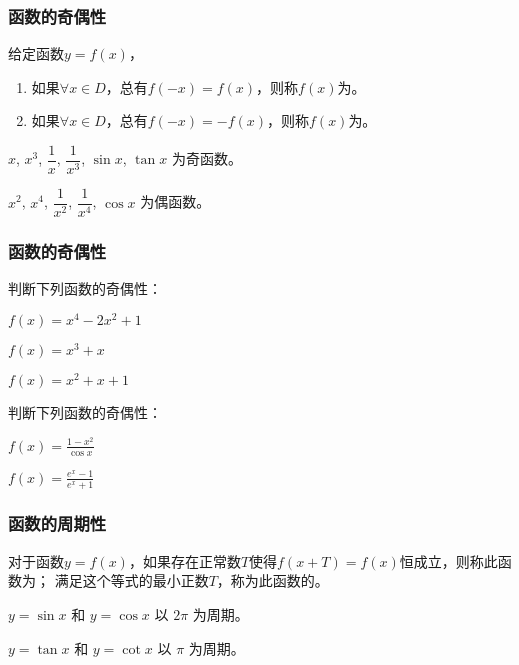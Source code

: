 \documentclass[14pt,notheorems,leqno,xcolor={rgb}]{beamer} %
\begin{document}
\begin{frame}
\frametitle{函数的奇偶性}
\begin{definition}
给定函数$y=f(x)$，
\begin{enumerate}
  \item 如果$\forall x\in D$，总有$f(-x)=f(x)$，则称$f(x)$为。
  \item 如果$\forall x\in D$，总有$f(-x)=-f(x)$，则称$f(x)$为。
\end{enumerate}
\end{definition}
\vpause
\begin{example*}
$x$, $x^3$, $\dfrac1x$, $\dfrac1{x^3}$, $\sin x$, $\tan x$ 为奇函数。
\end{example*}
\pause
\begin{example*}
$x^2$, $x^4$, $\dfrac1{x^2}$, $\dfrac1{x^4}$, $\cos x$ 为偶函数。
\end{example*}
\end{frame}

\begin{frame}
\frametitle{函数的奇偶性}
\begin{example}
判断下列函数的奇偶性：
\begin{enumlite}
  \item $f(x)=x^4-2x^2+1$ %
  \item $f(x)=x^3+x$ %
  \item $f(x)=x^2+x+1$ %
\end{enumlite}
\end{example}
\pause
\begin{exercise}
判断下列函数的奇偶性：
\begin{enumlite}
  \item $f(x)=\frac{1-x^2}{\cos x}$ 
  \item $f(x)=\frac{e^x-1}{e^x+1}$ 
\end{enumlite}
\end{exercise}
\end{frame}

\begin{frame}
\frametitle{函数的周期性}
\begin{definition}
对于函数$y=f(x)$，如果存在正常数$T$使得$f(x+T)=f(x)$恒成立，则称此函数为；
满足这个等式的最小正数$T$，称为此函数的。
\end{definition}
\vpause
\begin{example*}
$y=\sin x$ 和 $y=\cos x$ 以 $2\pi$ 为周期。
\end{example*}
\pause
\begin{example*}
$y=\tan x$ 和 $y=\cot x$ 以 $\pi$ 为周期。
\end{example*}
\end{frame}
\end{document}
